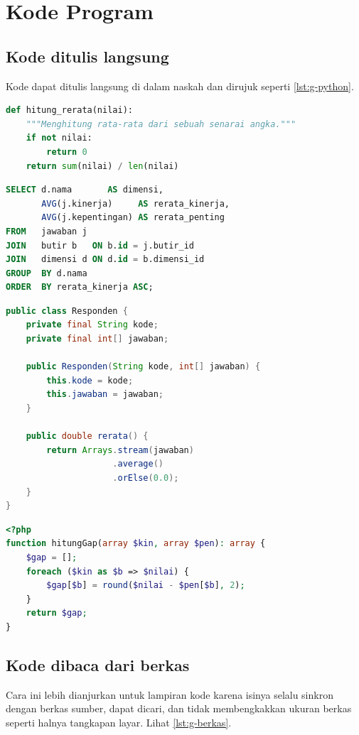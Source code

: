 \section{Kode Program}

\subsection{Kode ditulis langsung}
Kode dapat ditulis langsung di dalam naskah dan dirujuk seperti
\cref{lst:g-python}.

\begin{lstlisting}[language=Python, caption={Contoh kode Python}, label=lst:g-python]
def hitung_rerata(nilai):
    """Menghitung rata-rata dari sebuah senarai angka."""
    if not nilai:
        return 0
    return sum(nilai) / len(nilai)
\end{lstlisting}

\begin{lstlisting}[language=SQL, caption={Contoh kueri SQL}, label=lst:g-sql]
SELECT d.nama       AS dimensi,
       AVG(j.kinerja)     AS rerata_kinerja,
       AVG(j.kepentingan) AS rerata_penting
FROM   jawaban j
JOIN   butir b   ON b.id = j.butir_id
JOIN   dimensi d ON d.id = b.dimensi_id
GROUP  BY d.nama
ORDER  BY rerata_kinerja ASC;
\end{lstlisting}

\begin{lstlisting}[language=Java, caption={Contoh kode Java}, label=lst:g-java]
public class Responden {
    private final String kode;
    private final int[] jawaban;

    public Responden(String kode, int[] jawaban) {
        this.kode = kode;
        this.jawaban = jawaban;
    }

    public double rerata() {
        return Arrays.stream(jawaban)
                     .average()
                     .orElse(0.0);
    }
}
\end{lstlisting}

\begin{lstlisting}[language=PHP, caption={Contoh kode PHP}, label=lst:g-php]
<?php
function hitungGap(array $kin, array $pen): array {
    $gap = [];
    foreach ($kin as $b => $nilai) {
        $gap[$b] = round($nilai - $pen[$b], 2);
    }
    return $gap;
}
\end{lstlisting}

\subsection{Kode dibaca dari berkas}
Cara ini lebih dianjurkan untuk lampiran kode karena isinya selalu sinkron
dengan berkas sumber, dapat dicari, dan tidak membengkakkan ukuran berkas
seperti halnya tangkapan layar. Lihat \cref{lst:g-berkas}.

